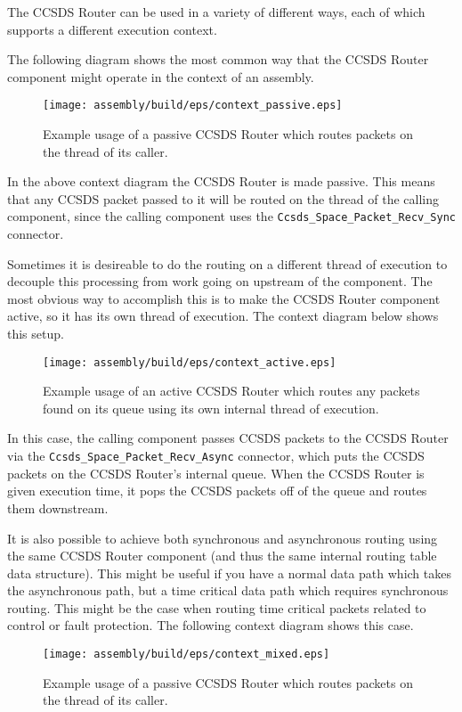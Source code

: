 The CCSDS Router can be used in a variety of different ways, each of which supports a different execution context.

The following diagram shows the most common way that the CCSDS Router component might operate in the context of an assembly.

\begin{figure}[H]
  \texttt{[image: assembly/build/eps/context\_passive.eps]}
  \caption{Example usage of a passive CCSDS Router which routes packets on the thread of its caller.}
\end{figure}

In the above context diagram the CCSDS Router is made passive. This means that any CCSDS packet passed to it will be routed on the thread of the calling component, since the calling component uses the \texttt{Ccsds\_Space\_Packet\_Recv\_Sync} connector.

Sometimes it is desireable to do the routing on a different thread of execution to decouple this processing from work going on upstream of the component. The most obvious way to accomplish this is to make the CCSDS Router component active, so it has its own thread of execution. The context diagram below shows this setup.

\begin{figure}[H]
  \texttt{[image: assembly/build/eps/context\_active.eps]}
  \caption{Example usage of an active CCSDS Router which routes any packets found on its queue using its own internal thread of execution.}
\end{figure}

In this case, the calling component passes CCSDS packets to the CCSDS Router via the \texttt{Ccsds\_Space\_Packet\_Recv\_Async} connector, which puts the CCSDS packets on the CCSDS Router's internal queue. When the CCSDS Router is given execution time, it pops the CCSDS packets off of the queue and routes them downstream.

It is also possible to achieve both synchronous and asynchronous routing using the same CCSDS Router component (and thus the same internal routing table data structure). This might be useful if you have a normal data path which takes the asynchronous path, but a time critical data path which requires synchronous routing. This might be the case when routing time critical packets related to control or fault protection. The following context diagram shows this case.

\begin{figure}[H]
  \texttt{[image: assembly/build/eps/context\_mixed.eps]}
  \caption{Example usage of a passive CCSDS Router which routes packets on the thread of its caller.}
\end{figure}

